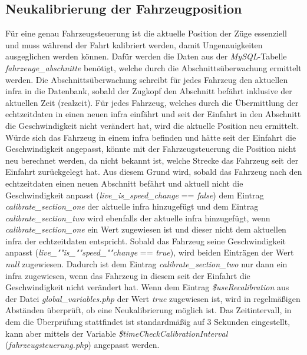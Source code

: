 \subsection{Neukalibrierung der Fahrzeugposition}  \label{main_5}
Für eine genau Fahrzeugsteuerung ist die aktuelle Position der Züge es­sen­zi­ell und muss während der Fahrt kalibriert werden, damit Ungenauigkeiten ausgeglichen werden können. Dafür werden die Daten aus der \textit{MySQL}-Tabelle \textit{fahrzeuge\_abschnitte} benötigt, welche durch die Abschnittsüberwachung ermittelt werden. Die Abschnittsüberwachung schreibt für jedes Fahrzeug den aktuellen \ac{infra} in die Datenbank, sobald der Zugkopf den Abschnitt befährt inklusive der aktuellen Zeit (\Gls{realzeit}). Für jedes Fahrzeug, welches durch die Übermittlung der \Gls{echtzeitdaten} in einen neuen \ac{infra} einfährt und seit der Einfahrt in den Abschnitt die Geschwindigkeit nicht verändert hat, wird die aktuelle Position neu ermittelt. Würde sich das Fahrzeug in einem \ac{infra} befinden und hätte seit der Einfahrt die Geschwindigkeit angepasst, könnte mit der Fahrzeugsteuerung die Position nicht neu berechnet werden, da nicht bekannt ist, welche Strecke das Fahrzeug seit der Einfahrt zurückgelegt hat. Aus diesem Grund wird, sobald das Fahrzeug nach den \Gls{echtzeitdaten} einen neuen Abschnitt befährt und aktuell nicht die Geschwindigkeit anpasst (\textit{live\_is\_speed\_change} == \textit{false}) dem Eintrag \textit{calibrate\_section\_one} der aktuelle \ac{infra} hinzugefügt und dem Eintrag \textit{calibrate\_section\_two} wird ebenfalls der aktuelle \ac{infra} hinzugefügt, wenn \textit{calibrate\_section\_one} ein Wert zugewiesen ist und dieser nicht dem aktuellen \ac{infra} der \Gls{echtzeitdaten} entspricht. Sobald das Fahrzeug seine Geschwindigkeit anpasst (\textit{live\_""is\_""speed\_""change} == \textit{true}), wird beiden Einträgen der Wert \textit{null} zugewiesen. Dadurch ist dem Eintrag \textit{calibrate\_section\_two} nur dann ein \ac{infra} zugewiesen, wenn das Fahrzeug in diesem seit der Einfahrt die Geschwindigkeit nicht verändert hat. Wenn dem Eintrag \textit{\$useRecalibration} aus der Datei \textit{global\_variables.php} der Wert \textit{true} zugewiesen ist, wird in regelmäßigen Abständen überprüft, ob eine Neukalibrierung möglich ist. Das Zeitintervall, in dem die Überprüfung stattfindet ist standardmäßig auf 3 Sekunden eingestellt, kann aber mittels der Variable \textit{\$timeCheckCalibrationInterval} (\textit{fahrzeugsteuerung.php}) angepasst werden.

